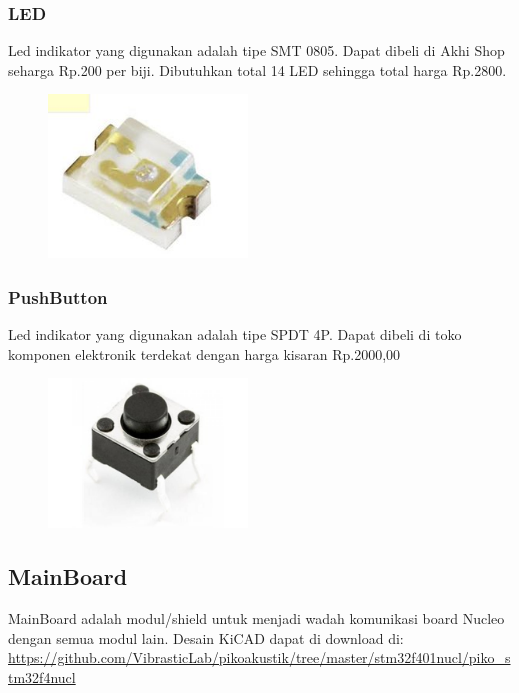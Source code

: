 \documentclass[12pt,]{article}
\begin{document}
	\newpage
	\subsubsection{LED}
	
	Led indikator yang digunakan adalah tipe SMT 0805.
	Dapat dibeli di Akhi Shop seharga Rp.200 per biji.
	Dibutuhkan total 14 LED sehingga total harga Rp.2800.
	
	\begin{figure}[!ht]
		\centering
		\includegraphics[width=150pt]{images/led0805}
	\end{figure}

	\subsubsection{PushButton}
	
	Led indikator yang digunakan adalah tipe SPDT 4P.
	Dapat dibeli di toko komponen elektronik terdekat dengan harga kisaran Rp.2000,00
	
	\begin{figure}[!ht]
		\centering
		\includegraphics[width=150pt]{images/button}
	\end{figure}

	\newpage
	\subsection{MainBoard}
	
	MainBoard adalah modul/shield untuk menjadi wadah komunikasi board Nucleo dengan semua modul lain.
	Desain KiCAD dapat di download di:\\
	\url{https://github.com/VibrasticLab/pikoakustik/tree/master/stm32f401nucl/piko_stm32f4nucl}
	
\end{document}
